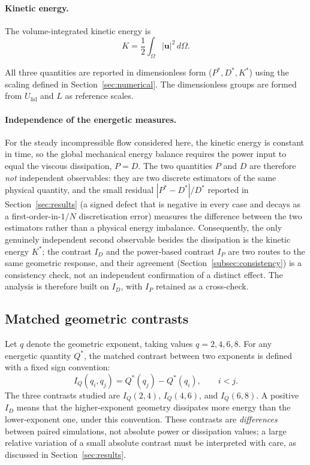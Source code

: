 \paragraph{Kinetic energy.}
The volume-integrated kinetic energy is
\begin{equation}
K = \frac{1}{2}\int_{\Omega} |\mathbf{u}|^2\, d\Omega.
\end{equation}

All three quantities are reported in dimensionless form ($P^*,D^*,K^*$) using the scaling defined in Section~\ref{sec:numerical}. The dimensionless groups are formed from $U_{\mathrm{lid}}$ and $L$ as reference scales.

\paragraph{Independence of the energetic measures.}
For the steady incompressible flow considered here, the kinetic energy is constant in time, so the global mechanical energy balance requires the power input to equal the viscous dissipation, $P=D$. The two quantities $P$ and $D$ are therefore \emph{not} independent observables: they are two discrete estimators of the same physical quantity, and the small residual $|P^*-D^*|/D^*$ reported in Section~\ref{sec:results} (a signed defect that is negative in every case and decays as a first-order-in-$1/N$ discretisation error) measures the difference between the two estimators rather than a physical energy imbalance. Consequently, the only genuinely independent second observable besides the dissipation is the kinetic energy $K^*$; the contrast $I_D$ and the power-based contrast $I_P$ are two routes to the same geometric response, and their agreement (Section~\ref{subsec:consistency}) is a consistency check, not an independent confirmation of a distinct effect. The analysis is therefore built on $I_D$, with $I_P$ retained as a cross-check.

\subsection{Matched geometric contrasts}
\label{subsec:contrasts}

Let $q$ denote the geometric exponent, taking values $q=2,4,6,8$. For any energetic quantity $Q^*$, the matched contrast between two exponents is defined with a fixed sign convention:
\begin{equation}
I_Q(q_i,q_j) = Q^*(q_j) - Q^*(q_i), \qquad i<j.
\label{eq:contrast}
\end{equation}
The three contrasts studied are $I_Q(2,4)$, $I_Q(4,6)$, and $I_Q(6,8)$. A positive $I_D$ means that the higher-exponent geometry dissipates more energy than the lower-exponent one, under this convention. These contrasts are \emph{differences} between paired simulations, not absolute power or dissipation values; a large relative variation of a small absolute contrast must be interpreted with care, as discussed in Section~\ref{sec:results}.

